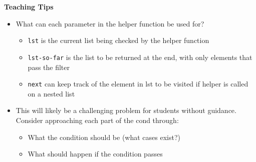 \begin{blocksection}
\begin{guide}
\textbf{Teaching Tips}
\begin{itemize}
  \item What can each parameter in the helper function be used for?
  \begin{itemize}
    \item \lstinline{lst} is the current list being checked by the helper function
    \item \lstinline{lst-so-far} is the list to be returned at the end, with only elements that pass the filter
    \item \lstinline{next} can keep track of the element in lst to be visited if helper is called on a nested list
  \end{itemize}
  \item This will likely be a challenging problem for students without guidance. Consider approaching each part of the cond through:
  \begin{itemize}
    \item What the condition should be (what cases exist?)
    \item What should happen if the condition passes
  \end{itemize}
\end{itemize}
\end{guide}
\end{blocksection}
